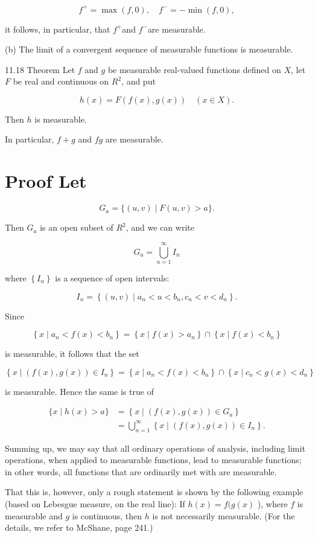 \documentclass[10pt]{article}
\begin{document}
$$
f^{+}=\max (f, 0), \quad f^{-}=-\min (f, 0),
$$

it follows, in particular, that $f^{+}$and $f^{-}$are measurable.

(b) The limit of a convergent sequence of measurable functions is measurable.

11.18 Theorem Let $f$ and $g$ be measurable real-valued functions defined on $X$, let $F$ be real and continuous on $R^{2}$, and put

$$
h(x)=F(f(x), g(x)) \quad(x \in X) .
$$

Then $h$ is measurable.

In particular, $f+g$ and $f g$ are measurable.

\section{Proof Let}
$$
G_{a}=\{(u, v) \mid F(u, v)>a\} .
$$

Then $G_{a}$ is an open subset of $R^{2}$, and we can write

$$
G_{a}=\bigcup_{n=1}^{\infty} I_{n}
$$

where $\left\{I_{n}\right\}$ is a sequence of open intervals:

$$
I_{n}=\left\{(u, v) \mid a_{n}<u<b_{n}, c_{n}<v<d_{n}\right\} .
$$

Since

$$
\left\{x \mid a_{n}<f(x)<b_{n}\right\}=\left\{x \mid f(x)>a_{n}\right\} \cap\left\{x \mid f(x)<b_{n}\right\}
$$

is measurable, it follows that the set

$$
\left\{x \mid(f(x), g(x)) \in I_{n}\right\}=\left\{x \mid a_{n}<f(x)<b_{n}\right\} \cap\left\{x \mid c_{n}<g(x)<d_{n}\right\}
$$

is measurable. Hence the same is true of

$$
\begin{aligned}
\{x \mid h(x)>a\} & =\left\{x \mid(f(x), g(x)) \in G_{a}\right\} \\
& =\bigcup_{n=1}^{\infty}\left\{x \mid(f(x), g(x)) \in I_{n}\right\} .
\end{aligned}
$$

Summing up, we may say that all ordinary operations of analysis, including limit operations, when applied to measurable functions, lead to measurable functions; in other words, all functions that are ordinarily met with are measurable.

That this is, however, only a rough statement is shown by the following example (based on Lebesgue measure, on the real line): If $h(x)=f(g(x)$ ), where $f$ is measurable and $g$ is continuous, then $h$ is not necessarily measurable. (For the details, we refer to McShane, page 241.)
\end{document}

